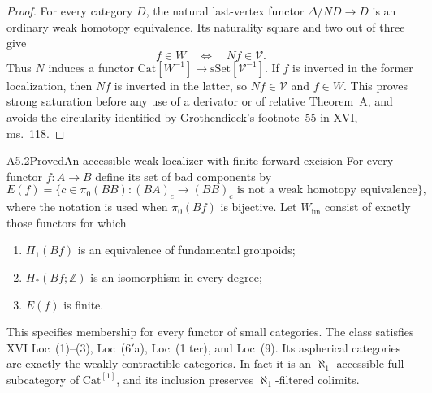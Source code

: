 \begin{proof}
For every category $D$, the natural last-vertex functor
$\Delta/ND\to D$ is an ordinary weak homotopy equivalence.  Its naturality
square and two out of three give
\[
                 f\in W\quad\Longleftrightarrow\quad Nf\in\mathcal V.
\]
Thus $N$ induces a functor
$\mathrm{Cat}[W^{-1}]\to\mathrm{sSet}[\mathcal V^{-1}]$.
If $f$ is inverted in the former localization, then $Nf$ is inverted in
the latter, so $Nf\in\mathcal V$ and $f\in W$.
This proves strong saturation before any use of a derivator or of relative
Theorem~A, and avoids the circularity identified by Grothendieck's
footnote~55 in XVI, ms.~118.
\end{proof}

\begin{claim}{A5.2}{Proved}{An accessible weak localizer with finite forward excision}
\label{A52}
For every functor $f:A\to B$ define its set of bad components by
\[
 E(f)=\{c\in\pi_0(BB): (BA)_c\longrightarrow (BB)_c
                   \text{ is not a weak homotopy equivalence}\},
\]
where the notation is used when $\pi_0(Bf)$ is bijective.  Let
$W_{\mathrm{fin}}$ consist of exactly those functors for which
\begin{enumerate}
\item $\Pi_1(Bf)$ is an equivalence of fundamental groupoids;
\item $H_*(Bf;\mathbb Z)$ is an isomorphism in every degree;
\item $E(f)$ is finite.
\end{enumerate}
This specifies membership for every functor of small categories.
The class satisfies XVI Loc~(1)--(3), Loc~($6'$a), Loc~(1 ter), and
Loc~(9).  Its aspherical categories are exactly the weakly contractible
categories.  In fact it is an $\aleph_1$-accessible full subcategory of
$\mathrm{Cat}^{[1]}$, and its inclusion preserves
$\aleph_1$-filtered colimits.
\end{claim}
